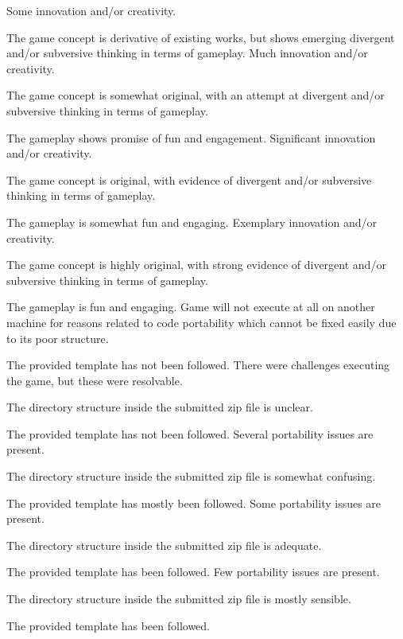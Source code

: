 \documentclass{../fal_assignment}
\begin{document}
\begin{markingrubric}
        \grade Some innovation and/or creativity.
            \par The game concept is derivative of existing works, but shows emerging divergent and/or subversive thinking in terms of gameplay.
        \grade Much innovation and/or creativity.
            \par The game concept is somewhat original, with an attempt at divergent and/or subversive thinking in terms of gameplay.
            \par The gameplay shows promise of fun and engagement.
        \grade Significant innovation and/or creativity.
            \par The game concept is original, with evidence of divergent and/or subversive thinking in terms of gameplay.
            \par The gameplay is somewhat fun and engaging.
        \grade Exemplary innovation and/or creativity.
            \par The game concept is highly original, with strong evidence of divergent and/or subversive thinking in terms of gameplay.
            \par The gameplay is fun and engaging.
        \grade\fail Game will not execute at all on another machine for reasons related to code portability which cannot be fixed easily due to its poor structure.
            \par The provided template has not been followed.
        \grade There were challenges executing the game, but these were resolvable.
            \par The directory structure inside the submitted zip file is unclear.
            \par The provided template has not been followed.
        \grade Several portability issues are present.
            \par The directory structure inside the submitted zip file is somewhat confusing.
            \par The provided template has mostly been followed.
        \grade Some portability issues are present.
            \par The directory structure inside the submitted zip file is adequate.
            \par The provided template has been followed.
        \grade Few portability issues are present.
            \par The directory structure inside the submitted zip file is mostly sensible.
            \par The provided template has been followed.

\end{markingrubric}
\end{document}
